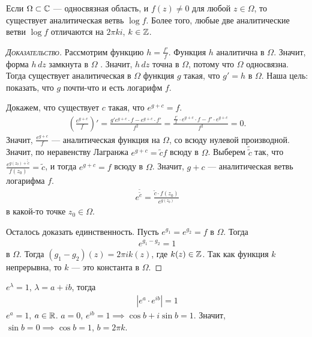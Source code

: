 \documentclass[../../main.tex]{subfiles}
\begin{document}
\begin{thm}[%
]
 Если $ \Omega \subset \mathbb{C} $ --- односвязная область, и $ f(z) \neq 0 $ для любой $ z \in \Omega $, то существует аналитическая ветвь $ \log f $. Более того, любые две аналитические ветви $ \log f $ отличаются на $ 2\pi k i $, $ k \in \mathbb{Z} $.
\end{thm}
\begin{proof}[\normalfont\textsc{Доказательство}]
 Рассмотрим функцию $h = \frac{f'}{f}$. Функция $ h $ аналитична в $ \Omega $. Значит, форма  $ h\,dz $ замкнута в  $ \Omega $ . Значит, $ h\,dz $ точна в  $ \Omega $, потому что  $ \Omega $  односвязна. Тогда существует аналитическая в $ \Omega $  функция $ g $  такая, что $ g' = h $ в  $ \Omega $. Наша цель: показать, что $ g $  почти-что и есть логарифм $ f $.

 Докажем, что существует $ c $  такая, что $ e^{g+c} = f $.
 \begin{align*}
  \left( \frac{e^{g+c}}{f} \right)' = \frac{g' e^{g+c} \cdot f - e^{g+c} \cdot f'}{f^{2}} = \frac{\frac{f'}{f} \cdot e^{g+c} \cdot f - f' \cdot e^{g+c}}{f^{2}} = 0.
 \end{align*} Значит, $ \frac{e^{g+c}}{f} $  --- аналитическая функция на $ \Omega $, со всюду нулевой производной. Значит, по неравенству Лагранжа $ e^{g+c} = \tilde c f $ всюду в $ \Omega $. Выберем $ \tilde {\tilde c} $ так, что $ \frac{e^{g(z_0) + \tilde {\tilde c}}}{f(z_0)} = \tilde c $, и тогда $ e^{g+c} = f $ всюду в $ \Omega $. Значит, $ g + c $ --- аналитическая ветвь логарифма $ f $.
 \begin{align*}
  e^{\tilde {\tilde c}} = \frac{\tilde c \cdot f(z_0)}{e^{g(z_0)}}
 \end{align*} в какой-то точке $ z_0 \in \Omega $.

 Осталось доказать единственность. Пусть $ e^{g_1} = e^{g_2} = f $ в $ \Omega $. Тогда
 \begin{align*}
  e^{g_1 - g_2} = 1
 \end{align*} в $ \Omega $. Тогда $ (g_1-g_2)(z) = 2\pi i k (z) $, где $ k(z) \in \mathbb{Z}$. Так как функция $k$ непрерывна, то $ k $ --- это константа в $ \Omega $.
\end{proof}
\begin{remrk*}
 $ e^{\lambda} = 1 $, $ \lambda = a + ib $, тогда
 \begin{align*}
  \left|e^{a} \cdot e^{ib} \right| = 1
 \end{align*} $ e^{a} = 1 $, $ a \in \mathbb{R} $. $ a = 0 $, $ e^{ib} = 1 \implies \cos b + i \sin b = 1$. Значит, $ \sin b = 0 \implies \cos b = 1 $, $ b = 2\pi k $.
\end{remrk*}
\end{document}
